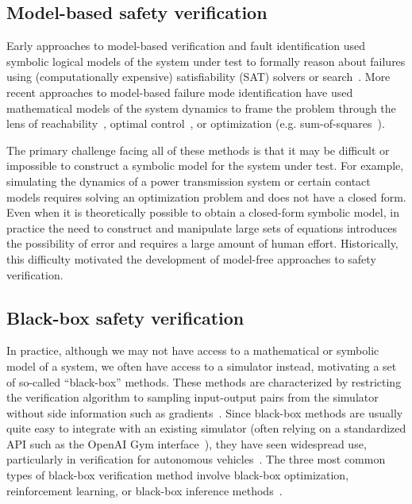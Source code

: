 \subsection{Model-based safety verification}

Early approaches to model-based verification and fault identification used symbolic logical models of the system under test to formally reason about failures using (computationally expensive) satisfiability (SAT) solvers or search~\cite{dekleerDiagnosingMultipleFaults1987,benardRemoteAgentExperiment2000}. More recent approaches to model-based failure mode identification have used mathematical models of the system dynamics to frame the problem through the lens of reachability~\cite{annpureddySTaLiRoToolTemporal2011,bansalHamiltonJacobiReachabilityBrief2017}, optimal control~\cite{chouUsingControlSynthesis2018}, or optimization (e.g. sum-of-squares~\cite{ahmadiApplicationsPolynomialOptimization2016,majumdarControlVerificationHighdimensional2014}).

The primary challenge facing all of these methods is that it may be difficult or impossible to construct a symbolic model for the system under test. For example, simulating the dynamics of a power transmission system or certain contact models requires solving an optimization problem and does not have a closed form. Even when it is theoretically possible to obtain a closed-form symbolic model, in practice the need to construct and manipulate large sets of equations introduces the possibility of error and requires a large amount of human effort. Historically, this difficulty motivated the development of model-free approaches to safety verification.

\subsection{Black-box safety verification}

In practice, although we may not have access to a mathematical or symbolic model of a system, we often have access to a simulator instead, motivating a set of so-called ``black-box'' methods. These methods are characterized by restricting the verification algorithm to sampling input-output pairs from the simulator without side information such as gradients~\cite{corsoSurveyAlgorithmsBlackBox2021}. Since black-box methods are usually quite easy to integrate with an existing simulator (often relying on a standardized API such as the OpenAI Gym interface~\cite{brockmanOpenAIGym2016}), they have seen widespread use, particularly in verification for autonomous vehicles~\cite{xuSafeBenchBenchmarkingPlatform2022,riedmaierSurveyScenarioBasedSafety2020,okellyScalableEndtoEndAutonomous2018,corsoAdaptiveStressTesting2019,wangAdvSimGeneratingSafetyCritical2021,sunCornerCaseGeneration2021,zhongGuidedConditionalDiffusion2022,corsoInterpretableSafetyValidation2020a,zhangAdversarialRobustnessTrajectory2022,hanselmannKINGGeneratingSafetyCritical2022a}. The three most common types of black-box verification method involve black-box optimization, reinforcement learning, or black-box inference methods~\cite{corsoSurveyAlgorithmsBlackBox2021}.

